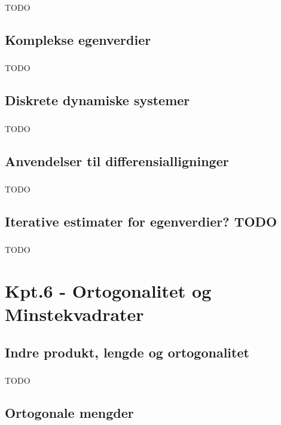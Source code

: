 \documentclass{article}
\begin{document}
      \subsubsection{}
        TODO
    \subsection{Komplekse egenverdier}
      \subsubsection{}
        TODO
    \subsection{Diskrete dynamiske systemer}
      \subsubsection{}
        TODO
    \subsection{Anvendelser til differensialligninger}
      \subsubsection{}
        TODO
    \subsection{Iterative estimater for egenverdier? TODO}
      \subsubsection{}
        TODO
  \section{Kpt.6 - Ortogonalitet og Minstekvadrater}
    \subsection{Indre produkt, lengde og ortogonalitet}
      \subsubsection{}
        TODO
    \subsection{Ortogonale mengder}
\end{document}

